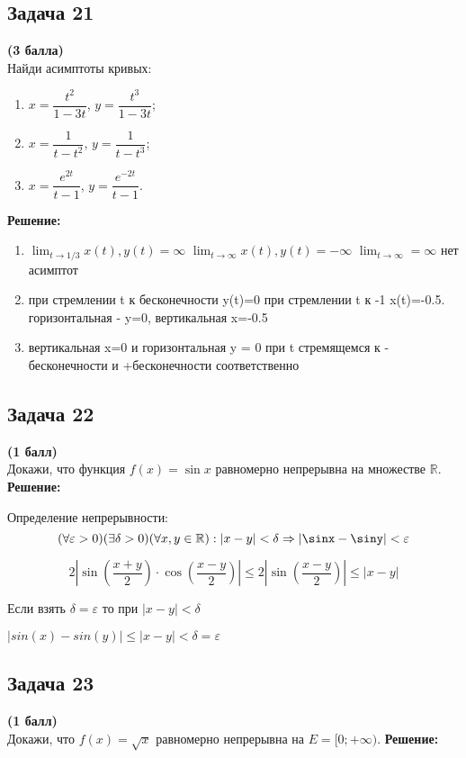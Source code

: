 \documentclass[a4paper,12pt]{article}
\begin{document}
\subsection{Задача 21}
\textbf{(3 балла)} \\
Найди асимптоты кривых:
\begin{enumerate}[label=\alph*)]
    \item $x = \dfrac{t^2}{1 - 3t}$, $y = \dfrac{t^3}{1 - 3t}$;
    \item $x = \dfrac{1}{t- t^2} $, $y = \dfrac{1}{t- t^3} $;
    \item $x = \dfrac{e^{2t}}{t - 1}$, $y = \dfrac{e^{-2t}}{t - 1}$.
\end{enumerate}
\textbf{Решение:}

\begin{enumerate}
    \item $\lim_{t \to 1/3}x(t), y(t)=\infty$
    $\lim_{t \to \infty}x(t), y(t) = -\infty$
    $\lim_{t \to \infty} = \infty$
    нет асимптот
    \item при стремлении t к бесконечности y(t)=0
    при стремлении t к -1 x(t)=-0.5. горизонтальная - y=0, вертикальная x=-0.5
    \item вертикальная x=0 и горизонтальная y = 0 при t стремящемся к - бесконечности и +бесконечности соответственно
\end{enumerate}

\subsection{Задача 22}
\textbf{(1 балл)} \\
Докажи, что функция $f(x) = \sin x$ равномерно непрерывна на множестве $\mathbb{R}$.
\textbf{Решение:}

Определение непрерывности: 
\[
(\forall \varepsilon > 0)(\exists \delta > 0)(\forall x, y \in \mathbb{R}): |x-y| < \delta \Rightarrow |\sinx - \siny| < \varepsilon
\]

\[
2|\sin(\frac{x+y}{2})\cdot \cos(\frac{x-y}{2})| \le 2|\sin(\frac{x-y}{2})|\le |x-y|
\]

Если взять $\delta = \varepsilon$ то при $|x-y|<\delta$

$|sin(x)-sin(y)| \le |x-y| < \delta = \varepsilon$

\subsection{Задача 23}
\textbf{(1 балл)} \\
Докажи, что $f(x) = \sqrt{x}$ равномерно непрерывна на $E = [0; +\infty)$.
\textbf{Решение:}
\end{document}
